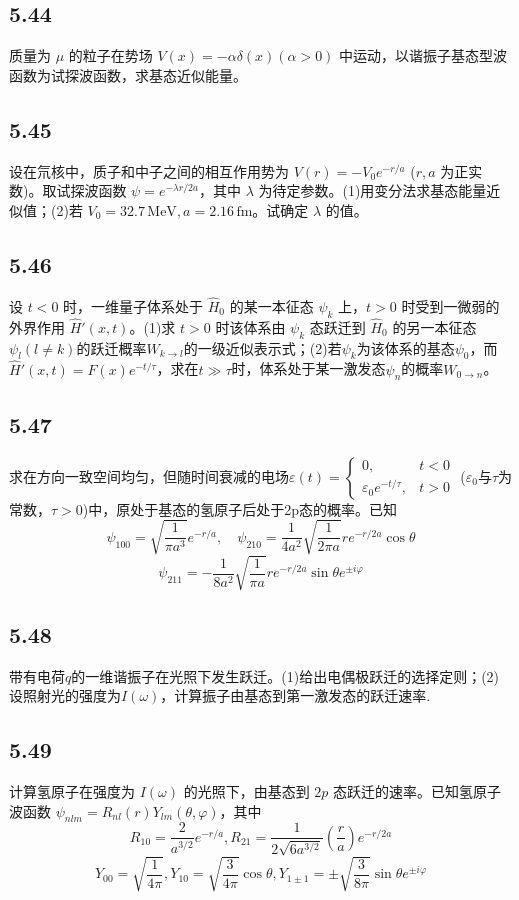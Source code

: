 \subsection{5.44}
质量为 $\mu$ 的粒子在势场 $V(x) = -\alpha \delta (x) (\alpha > 0)$ 中运动，以谐振子基态型波函数为试探波函数，求基态近似能量。

\subsection{5.45}
设在氘核中，质子和中子之间的相互作用势为 $V(r) = -V_0 e^{-r/a}$ ($r, a$ 为正实数)。取试探波函数 $\psi = e^{-\lambda r / 2a}$，其中 $\lambda$ 为待定参数。(1)用变分法求基态能量近似值；(2)若 $V_0 = 32.7 \, \text{MeV}, a = 2.16 \, \text{fm}$。试确定 $\lambda$ 的值。

\subsection{5.46}
设 $t < 0$ 时，一维量子体系处于 $\hat{H}_0$ 的某一本征态 $\psi_k$ 上，$t > 0$ 时受到一微弱的外界作用 $\hat{H}'(x,t)$。(1)求 $t > 0$ 时该体系由 $\psi_k$ 态跃迁到 $\hat{H}_0$ 的另一本征态 $\psi_{l}(l \neq k)$的跃迁概率$W_{k \to l}$的一级近似表示式；(2)若$\psi_{k}$为该体系的基态$\psi_{0}$，而 $\hat{H}'(x,t)=F(x)e^{-t/\tau}$，求在$t \gg \tau$时，体系处于某一激发态$\psi_{n}$的概率$W_{0 \to n}$。

\subsection{5.47}
求在方向一致空间均匀，但随时间衰减的电场$\varepsilon(t)=\begin{cases} 0, & t<0 \\ \varepsilon_{0}e^{-t/\tau}, & t>0 \end{cases}$ ($\varepsilon_{0}$与$\tau$为常数，$\tau > 0$)中，原处于基态的氢原子后处于2p态的概率。已知
$$\psi_{100}=\sqrt{\frac{1}{\pi a^{3}}}e^{-r/a}, \quad \psi_{210}=\frac{1}{4a^{2}}\sqrt{\frac{1}{2\pi a}}re^{-r/2a}\cos\theta$$
$$\psi_{211}=-\frac{1}{8a^{2}}\sqrt{\frac{1}{\pi a}}re^{-r/2a}\sin\theta e^{\pm i\varphi}$$

\subsection{5.48}
带有电荷$q$的一维谐振子在光照下发生跃迁。(1)给出电偶极跃迁的选择定则；(2)设照射光的强度为$I(\omega)$，计算振子由基态到第一激发态的跃迁速率.

\subsection{5.49}
计算氢原子在强度为 $I(\omega)$ 的光照下，由基态到 $2p$ 态跃迁的速率。已知氢原子波函数 $\psi_{nlm} = R_{nl}(r)Y_{lm}(\theta,\varphi)$，其中
$$R_{10} = \frac{2}{a^{3/2}}e^{-r/a}, R_{21} = \frac{1}{2\sqrt{6a^{3/2}}}\left(\frac{r}{a}\right)e^{-r/2a}$$
$$Y_{00} = \sqrt{\frac{1}{4\pi}}, Y_{10} = \sqrt{\frac{3}{4\pi}}\cos\theta, Y_{1\pm1} = \pm \sqrt{\frac{3}{8\pi}}\sin\theta e^{\pm i\varphi}$$

